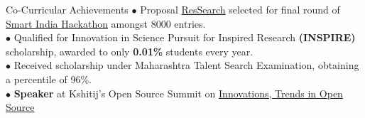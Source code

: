 \documentclass{resume} %
\begin{document}

\begin{rSection}{Co-Curricular Achievements}
$\bullet$ Proposal \href{https://docs.google.com/presentation/d/1ndJbIQCxFEf__I55yOOME-a_UGWDv1KMlukVE2lbDeA/}{ResSearch} selected for final round of \href{https://drive.google.com/open?id=0B5iU6cWw36rOamZLWHZENWdlY0k}{Smart India Hackathon} amongst 8000 entries. \\
$\bullet$ Qualified for Innovation in Science Pursuit for Inspired Research {\bf \large (INSPIRE)} scholarship, awarded to only \textbf{0.01\%} students every year. \\
$\bullet$ Received scholarship under Maharashtra Talent Search Examination, obtaining a percentile of 96\%.\\
$\bullet$ {\bf Speaker} at Kshitij's Open Source Summit on \href{https://www.youtube.com/watch?v=lk4ciY3NSbA}{Innovations, Trends in Open Source}
\end{rSection}


\end{document}
